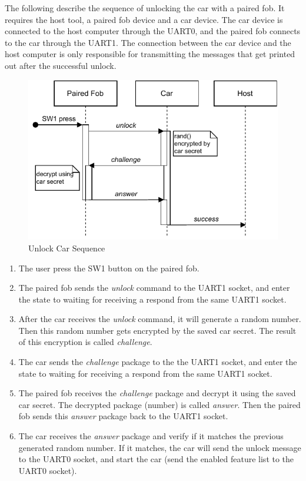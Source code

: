 \documentclass[11pt,oneside,onecolumn,letterpaper]{article}
\begin{document}
The following describe the sequence of unlocking the car with a paired fob. It requires the host tool, a paired fob device and a car device. The car device is connected to the host computer through the UART0, and the paired fob connects to the car through the UART1. The connection between the car device and the host computer is only responsible for transmitting the messages that get printed out after the successful unlock.

\begin{figure}[!htbp]
	\begin{centering}
		\includegraphics[width = .6\textwidth]{pic/unlock.pdf}
		\caption{Unlock Car Sequence}
		\label{fig:unlock}
	\end{centering}
\end{figure}

\begin{enumerate}
	\item The user press the SW1 button on the paired fob.
	\item The paired fob sends the \textit{unlock} command to the UART1 socket, and enter the state to waiting for receiving a respond from the same UART1 socket.
	\item After the car receives the \textit{unlock} command, it will generate a random number. Then this random number gets encrypted by the saved car secret. The result of this encryption is called \textit{challenge}.
	\item The car sends the \textit{challenge} package to the the UART1 socket, and enter the state to waiting for receiving a respond from the same UART1 socket.
	\item The paired fob receives the \textit{challenge} package and decrypt it using the saved car secret. The decrypted package (number) is called \textit{answer}. Then the paired fob sends this \textit{answer} package back to the UART1 socket.
	\item The car receives the \textit{answer} package and verify if it matches the previous generated random number. If it matches, the car will send the unlock message to the UART0 socket, and start the car (send the enabled feature list to the UART0 socket).
\end{enumerate}
\end{document}
